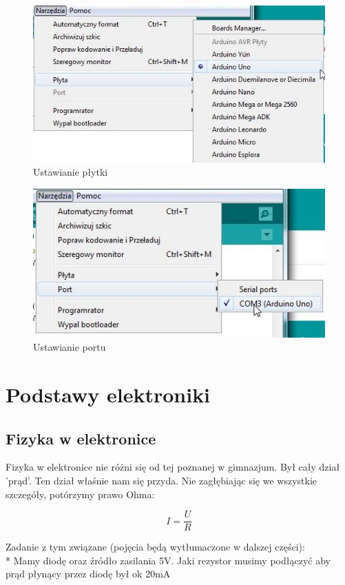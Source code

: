 \begin{figure} %
  \includegraphics[scale=0.7]{arduino-ustawPlytke.jpg}
  \caption{Ustawianie płytki}
  \label{fig:test}
	\end{figure}
	\begin{figure}
  \includegraphics[scale=0.7]{arduino-ustawPort.jpg}
  \caption{Ustawianie portu}
  \label{fig:test}
\end{figure}


\section{Podstawy elektroniki}
 \subsection{Fizyka w elektronice}
	Fizyka w elektronice nie różni się od tej poznanej w gimnazjum. Był cały dział 'prąd'. Ten dział właśnie nam się przyda. Nie zagłębiając się we wszystkie szczegóły, potórzymy prawo Ohma:
	\begin{center}
	\[
	I=\frac{U}{R}
	\]	
	\end{center}
Zadanie z tym związane (pojęcia będą wytłumaczone w dalszej części): \\* Mamy diodę oraz źródło zasilania 5V. Jaki rezystor musimy podłączyć aby prąd płynący przez diodę był ok 20mA %
